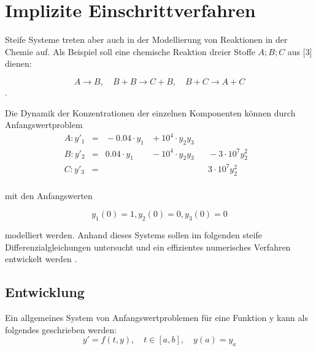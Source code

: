 \chapter{Implizite Einschrittverfahren}

Steife Systeme treten aber auch in der Modellierung von Reaktionen in der Chemie auf. Als Beispiel soll
eine chemische Reaktion dreier Stoffe $A;B;C$ aus [3] dienen:

\begin{equation*}
	A \rightarrow B, \quad B + B \rightarrow C+ B, \quad B + C \rightarrow A + C
\end{equation*}. 

Die Dynamik der Konzentrationen der einzelnen Komponenten können durch Anfangswertproblem
\begin{align}\label{eq:matrix}
	A:y'_1&= &{}-0.04\cdot y_1  &{}+ 10^4\cdot y_2y_3& & &\\
	B:y'_2&= & 0.04\cdot y_1  &{}- 10^4\cdot y_2y_3& &{}- 3\cdot 10^7y_2^2 &\\
	C:y'_3&= &                  &                  &  & 3\cdot 10^7y_2^2 &\\
\end{align}




mit den Anfangswerten

\begin{equation*}
y_1(0) = 1, y_2(0) = 0, y_3(0) = 0
\end{equation*}  

modelliert werden. Anhand dieses Systems sollen im folgenden steife Differenzialgleichungen untersucht
und ein effizientes numerisches Verfahren entwickelt werden \cite{Prof.Dr.AndreasZeiser.April2021}.

\section{Entwicklung}

Ein allgemeines System von Anfangswertproblemen für eine Funktion y kann als folgendes geschrieben werden:
\begin{equation}
	 y' = f(t,y) ,\quad t \in [a,b],\quad y(a) = y_a 
\end{equation}



